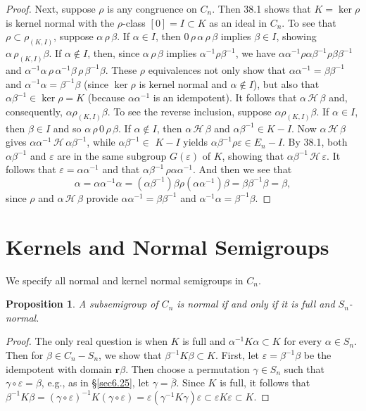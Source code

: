 \documentclass{surv-l}
\numberwithin{equation}{section}
\numberwithin{table}{section}
\numberwithin{figure}{section}
\newtheorem{proposition}[equation]{Proposition}
\theoremstyle{definition}
\begin{document}
\begin{proof}
Next, suppose $\rho$ is any congruence on $C_{n}$. Then 38.1 shows
that $K= \ker\rho$ is kernel normal with the
$\rho$-class $[0]= I \subset K$ as an ideal in $C_{n}$. To see
that $\rho\subset\rho_{(K,I)}$, suppose $\alpha\,\rho\,\beta$. If
$\alpha\in I$, then $0\,\rho\,\alpha\,\rho\,\beta$ implies $\beta\in I$,
showing $\alpha\,\rho_{(K,I)}\beta$. If $\alpha\not\in I$, then,
since $\alpha\,\rho\,\beta$ implies $\alpha^{-1}\rho\beta^{-1}$, we
have $\alpha\alpha^{-1}\rho\alpha\beta^{-1}\rho\beta\beta^{-1}$
and $\alpha^{-1}\alpha\,\rho\,\alpha^{-1}\beta\,\rho\,\beta^{-1}\beta$.
These $\rho$ equivalences not only show that
$\alpha\alpha^{-1}=\beta\beta^{-1}$ and
$\alpha^{-1}\alpha=\beta^{-1}\beta$ (since $\ker \rho$ is
kernel normal and $\alpha\not\in I$), but also that
$\alpha\beta^{-1}\in \ker \rho=K$ (because
$\alpha\alpha^{-1}$ is an idempotent). It follows that $\alpha\,\mathcal{H}\,\beta$ and, consequently, $\alpha\rho_{(K,I)}\beta$. To
see the reverse inclusion, suppose $\alpha\rho_{(K,I)}\beta$. If
$\alpha\in I$, then $\beta\in I$ and so $\alpha\,\rho \,0\,\rho\,\beta$.
If $\alpha\not\in I$, then $\alpha\,\mathcal{H}\,\beta$ and
$\alpha\beta^{-1}\in K-I$. Now $\alpha\,\mathcal{H}\,\beta$ gives
$\alpha\alpha^{-1}\,\mathcal{H}\,\alpha\beta^{-1}$, while
$\alpha\beta^{-1}\in$ $K-I$ yields
$\alpha\beta^{-1}\rho\varepsilon\in E_{n}- I$. By 38.1, both
$\alpha\beta^{-1}$ and $\varepsilon$ are in the same subgroup
$G(\varepsilon)$ of $K$, showing that
$\alpha\beta^{-1}\,\mathcal{H}\,\varepsilon$. It follows that
$\varepsilon=\alpha\alpha^{-1}$ and that
$\alpha\beta^{-1}\,\rho\alpha\alpha^{-1}$. And then we see that
\[
\alpha=\alpha\alpha^{-1}\alpha=(\alpha\beta^{-1})\beta\rho(\alpha\alpha^{-1})\beta=\beta\beta^{-1}\beta=\beta,
\]
since $\rho$ and $\alpha\,\mathcal{H}\,\beta$ provide
$\alpha\alpha^{-1}=\beta\beta^{-1}$ and
$\alpha^{-1}\alpha=\beta^{-1}\beta.$
\end{proof}

\section{Kernels and Normal Semigroups}\label{sec8.39}

We specify all normal and kernel normal semigroups in $C_{n}$.

\begin{proposition}\label{prop8.39.1}
A subsemigroup of $C_{n}$ is normal if and only if it is full and
$S_{n}$-normal.
\end{proposition}

\begin{proof} The only real question is when $K$ is full and
$\alpha^{-1}K\alpha\subset K$ for every $\alpha\in S_{n}$. Then
for $\beta\in C_{n}-S_{n}$, we show that $\beta^{-1}K\beta\subset
K$. First, let $\varepsilon =\beta^{-1}\beta$ be the idempotent
with domain $\mathbf{r}\beta$. Then choose a permutation
$\gamma\in S_{n}$ such that $\gamma \circ \varepsilon =\beta$,
e.g., as in \S\ref{sec6.25}, let $\gamma=\overline{\beta}$. Since
$K$ is full, it follows that
$\beta^{-1}K\beta=(\gamma\circ\varepsilon)^{-1}K(\gamma\circ\varepsilon)
=\varepsilon(\gamma^{-1}K\gamma)\varepsilon\subset\varepsilon
K\varepsilon \subset K$.
\end{proof}
\end{document}
